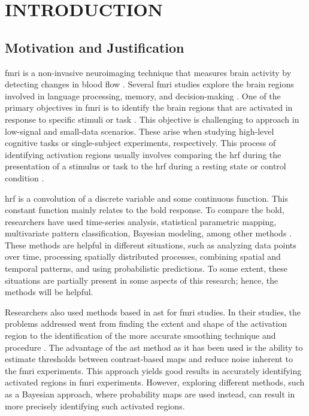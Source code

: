 \chapter{INTRODUCTION}

\section{Motivation and Justification}

\gls{fmri} is a non-invasive neuroimaging technique that measures brain activity by detecting changes in blood flow \cite{buchbinder2016functional, logothetis2008we, christopher2008applications}. Several \gls{fmri} studies explore the brain regions involved in language processing, memory, and decision-making \cite{gaillard2003developmental,golby2005memory,heekeren2003fmri}. One of the primary objectives in \gls{fmri} is to identify the brain regions that are activated in response to specific stimuli or task \cite{orchard2003simultaneous, deneux2006using, ardekani1999activation}. This objective is challenging to approach in low-signal and small-data scenarios. These arise when studying high-level cognitive tasks or single-subject experiments, respectively. This process of identifying activation regions usually involves comparing the \gls{hrf} during the presentation of a stimulus or task to the \gls{hrf} during a resting state or control condition \cite{arthurs2002well, logothetis2004nature, lee2013resting}.

\gls{hrf} is a convolution of a discrete variable and some continuous function. This constant function mainly relates to the \gls{bold} response. To compare the \gls{bold}, researchers have used time-series analysis, statistical parametric mapping, multivariate pattern classification, Bayesian modeling, among other methods \cite{adrian2018complex, marchini2004comparing, mumford2012deconvolving, makni2008fully}. These methods are helpful in different situations, such as analyzing data points over time, processing spatially distributed processes, combining spatial and temporal patterns, and using probabilistic predictions. To some extent, these situations are partially present in some aspects of this research; hence, the methods will be helpful.

Researchers also used methods based in \gls{ast} for \gls{fmri} studies. In their studies, the problems addressed went from finding the extent and shape of the activation region to the identification of the more accurate smoothing technique and procedure \cite{tabelow2006analyzing, lindquist2010adaptive, strappini2017adaptive,almodovar2019fast}. The advantage of the \gls{ast} method as it has been used is the ability to estimate thresholds between contrast-based maps and reduce noise inherent to the \gls{fmri} experiments. This approach yields good results in accurately identifying activated regions in \gls{fmri} experiments. However, exploring different methods, such as a Bayesian approach, where probability maps are used instead, can result in more precisely identifying such activated regions.

